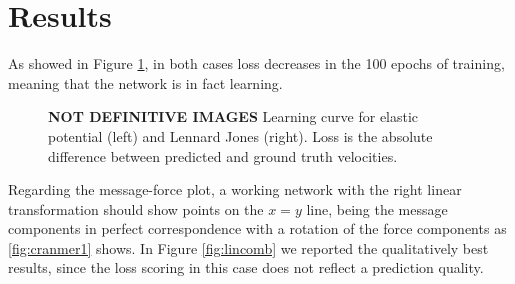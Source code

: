 \documentclass[../../master_thesis_np.tex]{subfiles}
\begin{document}
\section{Results} \label{4results}
As showed in Figure \ref{fig:learning_curve}, in both cases loss decreases in the 100 epochs of training, meaning that the network is in fact learning.

\begin{figure}[b]
	\centering
	\caption{\textbf{NOT DEFINITIVE IMAGES} Learning curve for elastic potential (left) and Lennard Jones (right). Loss is the absolute difference between predicted and ground truth velocities.}
	\label{fig:learning_curve}
\end{figure}
Regarding the message-force plot, a working network with the right linear transformation should show points on the $x = y$ line, being the message components in perfect correspondence with a rotation of the force components as \ref{fig:cranmer1} shows.
In Figure \ref{fig:lincomb} we reported the qualitatively best results, since the loss scoring in this case does not reflect a prediction quality.
\end{document}
